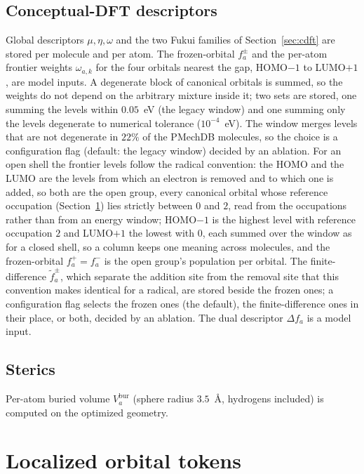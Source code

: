 \documentclass[11pt,a4paper]{article}
\begin{document}
\subsection{Conceptual-DFT descriptors}
Global descriptors $\mu,\eta,\omega$ and the two Fukui families of Section~\ref{sec:cdft} are stored per molecule and per atom. The frozen-orbital $f^\pm_a$ and the per-atom frontier weights $\omega_{a,k}$ for the four orbitals nearest the gap, HOMO$-1$ to LUMO$+1$, are model inputs. A degenerate block of canonical orbitals is summed, so the weights do not depend on the arbitrary mixture inside it; two sets are stored, one summing the levels within $0.05$~eV (the legacy window) and one summing only the levels degenerate to numerical tolerance ($10^{-4}$~eV). The window merges levels that are not degenerate in $22\%$ of the PMechDB molecules, so the choice is a configuration flag (default: the legacy window) decided by an ablation. For an open shell the frontier levels follow the radical convention: the HOMO and the LUMO are the levels from which an electron is removed and to which one is added, so both are the open group, every canonical orbital whose reference occupation (Section~\ref{sec:tokens}) lies strictly between $0$ and $2$, read from the occupations rather than from an energy window; HOMO$-1$ is the highest level with reference occupation $2$ and LUMO$+1$ the lowest with $0$, each summed over the window as for a closed shell, so a column keeps one meaning across molecules, and the frozen-orbital $f^+_a=f^-_a$ is the open group's population per orbital. The finite-difference $\tilde f^\pm_a$, which separate the addition site from the removal site that this convention makes identical for a radical, are stored beside the frozen ones; a configuration flag selects the frozen ones (the default), the finite-difference ones in their place, or both, decided by an ablation. The dual descriptor $\Delta f_a$ is a model input.

\subsection{Sterics}
Per-atom buried volume $V^{\mathrm{bur}}_a$ (sphere radius $3.5$~\AA, hydrogens included) is computed on the optimized geometry.

\section{Localized orbital tokens}
\label{sec:tokens}
\end{document}
